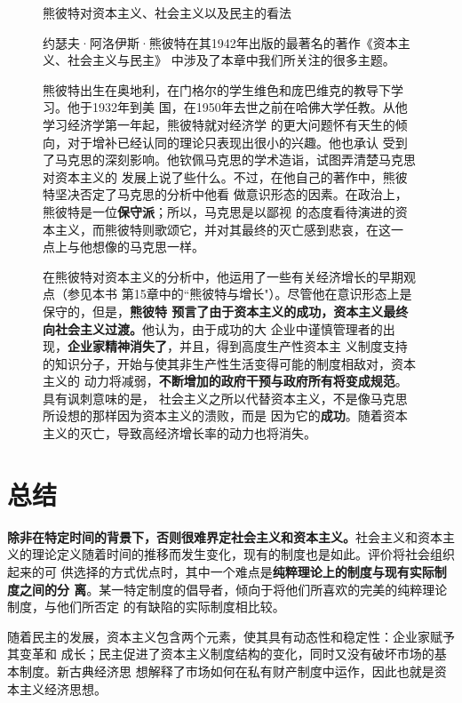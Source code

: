 \begin{figure}[ht]
\begin{mybox}{熊彼特对资本主义、社会主义以及民主的看法}
  \begin{multicols}{2}
    约瑟夫·阿洛伊斯·熊彼特在其1942年出版的最著名的著作《资本主义、社会主义与民主》
    中涉及了本章中我们所关注的很多主题。

    熊彼特出生在奥地利，在门格尔的学生维色和庞巴维克的教导下学习。他于1932年到美
    国，在1950年去世之前在哈佛大学任教。从他学习经济学第一年起，熊彼特就对经济学
    的更大问题怀有天生的倾向，对于增补已经认同的理论只表现出很小的兴趣。他也承认
    受到了马克思的深刻影响。他钦佩马克思的学术造诣，试图弄清楚马克思对资本主义的
    发展上说了些什么。不过，在他自己的著作中，熊彼特坚决否定了马克思的分析中他看
    做意识形态的因素。在政治上，熊彼特是一位\textbf{保守派}；所以，马克思是以鄙视
    的态度看待演进的资本主义，而熊彼特则歌颂它，并对其最终的灭亡感到悲哀，在这一
    点上与他想像的马克思一样。

    在熊彼特对资本主义的分析中，他运用了一些有关经济增长的早期观点（参见本书
    第15章中的“熊彼特与增长"）。尽管他在意识形态上是保守的，但是，\textbf{熊彼特
      预言了由于资本主义的成功，资本主义最终向社会主义过渡。}他认为，由于成功的大
    企业中谨慎管理者的出现，\textbf{企业家精神消失了}，并且，得到高度生产性资本主
    义制度支持的知识分子，开始与使其非生产性生活变得可能的制度相敌对，资本主义的
    动力将减弱，\textbf{不断增加的政府干预与政府所有将变成规范}。具有讽刺意味的是，
    社会主义之所以代替资本主义，不是像马克思所设想的那样因为资本主义的溃败，而是
    因为它的\textbf{成功}。随着资本主义的灭亡，导致高经济增长率的动力也将消失。
  \end{multicols}
\end{mybox}
\end{figure}

\section{总结}

\textbf{除非在特定时间的背景下，否则很难界定社会主义和资本主义。}社会主义和资本主
义的理论定义随着时间的推移而发生变化，现有的制度也是如此。评价将社会组织起来的可
供选择的方式优点时，其中一个难点是\textbf{纯粹理论上的制度与现有实际制度之间的分
  离}。某一特定制度的倡导者，倾向于将他们所喜欢的完美的纯粹理论制度，与他们所否定
的有缺陷的实际制度相比较。

随着民主的发展，资本主义包含两个元素，使其具有动态性和稳定性：企业家赋予其变革和
成长；民主促进了资本主义制度结构的变化，同时又没有破坏市场的基本制度。新古典经济思
想解释了市场如何在私有财产制度中运作，因此也就是资本主义经济思想。

